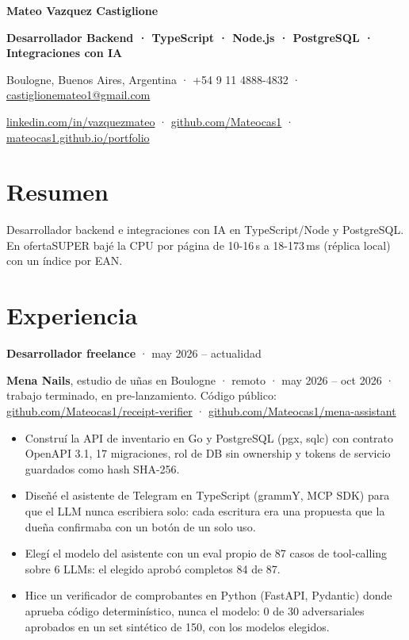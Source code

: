 \documentclass[10pt,a4paper]{article}
\newif\ifCVPublic
\newcommand{\role}[2]{\textbf{#1} · #2\par}
\newcommand{\gh}[1]{\href{https://github.com/Mateocas1/#1}{github.com/Mateocas1/#1}}
\begin{document}
{\LARGE\bfseries Mateo Vazquez Castiglione}\par
\vspace{2pt}
{\bfseries Desarrollador Backend · TypeScript · Node.js · PostgreSQL · Integraciones con IA}\par
\vspace{2pt}
Boulogne, Buenos Aires, Argentina · \ifCVPublic\else +54 9 11 4888-4832 · \fi
\href{mailto:castiglionemateo1@gmail.com}{castiglionemateo1@gmail.com}\par
\href{https://www.linkedin.com/in/vazquezmateo}{linkedin.com/in/vazquezmateo} ·
\href{https://github.com/Mateocas1}{github.com/Mateocas1} ·
\href{https://mateocas1.github.io/portfolio/}{mateocas1.github.io/portfolio}\par

\section{Resumen}
Desarrollador backend e integraciones con IA en TypeScript/Node y PostgreSQL. En ofertaSUPER bajé la CPU por página de 10-16\,s a 18-173\,ms (réplica local) con un índice por EAN.\par

\section{Experiencia}
\role{Desarrollador freelance}{may 2026 – actualidad}
\textbf{Mena Nails}, estudio de uñas en Boulogne · remoto · may 2026 – oct 2026 · trabajo terminado, en pre-lanzamiento. Código público: \gh{receipt-verifier} · \gh{mena-assistant}\par
\begin{itemize}
  \item Construí la API de inventario en Go y PostgreSQL (pgx, sqlc) con contrato OpenAPI 3.1, 17 migraciones, rol de DB sin ownership y tokens de servicio guardados como hash SHA-256.
  \item Diseñé el asistente de Telegram en TypeScript (grammY, MCP SDK) para que el LLM nunca escribiera solo: cada escritura era una propuesta que la dueña confirmaba con un botón de un solo uso.
  \item Elegí el modelo del asistente con un eval propio de 87 casos de tool-calling sobre 6 LLMs: el elegido aprobó completos 84 de 87.
  \item Hice un verificador de comprobantes en Python (FastAPI, Pydantic) donde aprueba código determinístico, nunca el modelo: 0 de 30 adversariales aprobados en un set sintético de 150, con los modelos elegidos.
\end{itemize}
\end{document}
